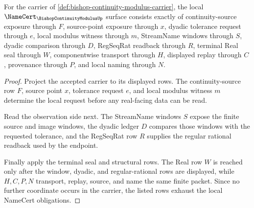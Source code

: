 \begin{theorem}
\label{thm:bishop-continuity-modulus-namecert-obligations}
For the carrier of \autoref{def:bishop-continuity-modulus-carrier}, the local $\NameCert_{\BishopContinuityModulusUp}$ surface consists exactly of continuity-source exposure through $F$, source-point exposure through $x$, dyadic tolerance request through $e$, local modulus witness through $m$, StreamName windows through $S$, dyadic comparison through $D$, RegSeqRat readback through $R$, terminal Real seal through $W$, componentwise transport through $H$, displayed replay through $C$, provenance through $P$, and local naming through $N$.
\end{theorem}
\begin{proof}
Project the accepted carrier to its displayed rows. The continuity-source row $F$, source point $x$, tolerance request $e$, and local modulus witness $m$ determine the local request before any real-facing data can be read.

Read the observation side next. The StreamName windows $S$ expose the finite source and image windows, the dyadic ledger $D$ compares those windows with the requested tolerance, and the RegSeqRat row $R$ supplies the regular rational readback used by the endpoint.

Finally apply the terminal seal and structural rows. The Real row $W$ is reached only after the window, dyadic, and regular-rational rows are displayed, while $H,C,P,N$ transport, replay, source, and name the same finite packet. Since no further coordinate occurs in the carrier, the listed rows exhaust the local NameCert obligations.
\end{proof}

